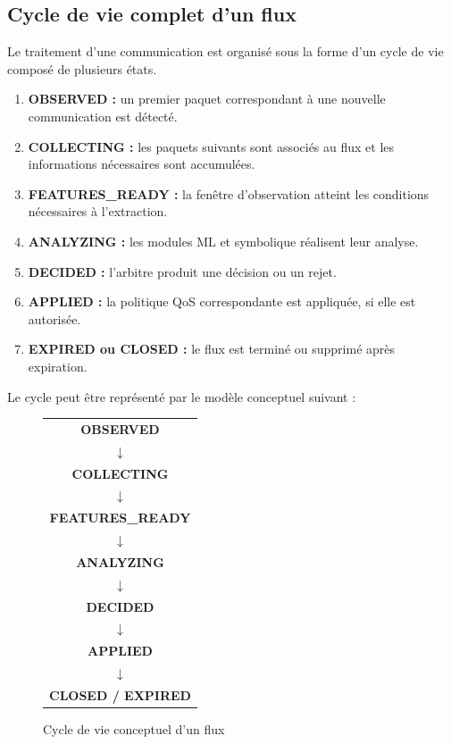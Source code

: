 \subsection{Cycle de vie complet d'un flux}

Le traitement d'une communication est organisé sous la forme d'un cycle de vie composé de plusieurs états.

\begin{enumerate}
    \item \textbf{OBSERVED :} un premier paquet correspondant à une nouvelle communication est détecté.
    \item \textbf{COLLECTING :} les paquets suivants sont associés au flux et les informations nécessaires sont accumulées.
    \item \textbf{FEATURES\_READY :} la fenêtre d'observation atteint les conditions nécessaires à l'extraction.
    \item \textbf{ANALYZING :} les modules ML et symbolique réalisent leur analyse.
    \item \textbf{DECIDED :} l'arbitre produit une décision ou un rejet.
    \item \textbf{APPLIED :} la politique QoS correspondante est appliquée, si elle est autorisée.
    \item \textbf{EXPIRED ou CLOSED :} le flux est terminé ou supprimé après expiration.
\end{enumerate}

Le cycle peut être représenté par le modèle conceptuel suivant :

\begin{figure}[H]
\centering
\begin{tabular}{c}
\textbf{OBSERVED} \\
$\downarrow$ \\
\textbf{COLLECTING} \\
$\downarrow$ \\
\textbf{FEATURES\_READY} \\
$\downarrow$ \\
\textbf{ANALYZING} \\
$\downarrow$ \\
\textbf{DECIDED} \\
$\downarrow$ \\
\textbf{APPLIED} \\
$\downarrow$ \\
\textbf{CLOSED / EXPIRED}
\end{tabular}
\caption{Cycle de vie conceptuel d'un flux}
\label{fig:cycle_vie_flux}
\end{figure}

